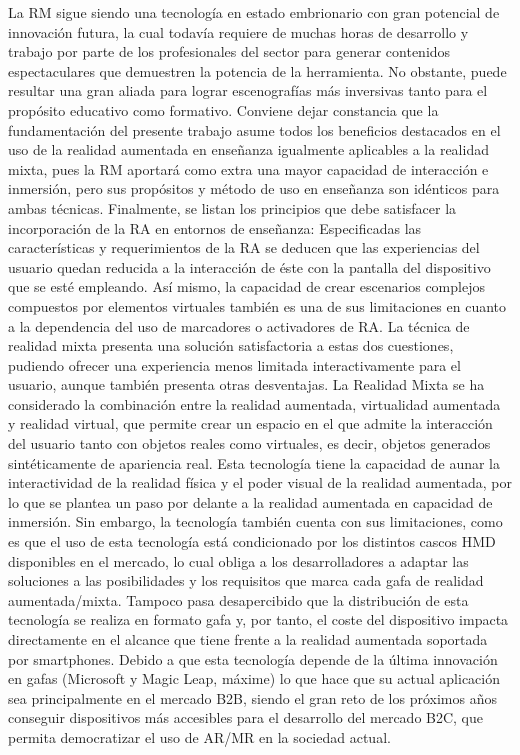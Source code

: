 La RM sigue siendo una tecnología en estado embrionario con gran potencial de innovación futura, la cual todavía requiere de muchas horas de desarrollo y trabajo por parte de los profesionales del sector para generar contenidos espectaculares que demuestren la potencia de la herramienta. No obstante, puede resultar una gran aliada para lograr escenografías más inversivas tanto para el propósito educativo como formativo.
Conviene dejar constancia que la fundamentación del presente trabajo asume todos los beneficios destacados en el uso de la realidad aumentada en enseñanza igualmente aplicables a la realidad mixta, pues la RM aportará como extra una mayor capacidad de interacción e inmersión, pero sus propósitos y método de uso en enseñanza son idénticos para ambas técnicas. Finalmente, se listan los principios que debe satisfacer la incorporación de la RA en entornos de enseñanza:
Especificadas las características y requerimientos de la RA se deducen que las experiencias del usuario quedan reducida a la interacción de éste con la pantalla del dispositivo que se esté empleando. Así mismo, la capacidad de crear escenarios complejos compuestos por elementos virtuales también es una de sus limitaciones en cuanto a la dependencia del uso de marcadores o activadores de RA. La técnica de realidad mixta presenta una solución satisfactoria a estas dos cuestiones, pudiendo ofrecer una experiencia menos limitada interactivamente para el usuario, aunque también presenta otras desventajas.
La Realidad Mixta se ha considerado la combinación entre la realidad aumentada, virtualidad aumentada y realidad virtual, que permite crear un espacio en el que admite la interacción del usuario tanto con objetos reales como virtuales, es decir, objetos generados sintéticamente de apariencia real. Esta tecnología tiene la capacidad de aunar la interactividad de la realidad física y el poder visual de la realidad aumentada, por lo que se plantea un paso por delante a la realidad aumentada en capacidad de inmersión. Sin embargo, la tecnología también cuenta con sus limitaciones, como es que el uso de esta tecnología está condicionado por los distintos cascos HMD disponibles en el mercado, lo cual obliga a los desarrolladores a adaptar las soluciones a las posibilidades y los requisitos que marca cada gafa de realidad aumentada/mixta. Tampoco pasa desapercibido que la distribución de esta tecnología se realiza en formato gafa y, por tanto, el coste del dispositivo impacta directamente en el alcance que tiene frente a la realidad aumentada soportada por smartphones. Debido a que esta tecnología depende de la última innovación en gafas (Microsoft y Magic Leap, máxime) lo que hace que su actual aplicación sea principalmente en el mercado B2B, siendo el gran reto de los próximos años conseguir dispositivos más accesibles para el desarrollo del mercado B2C, que permita democratizar el uso de AR/MR en la sociedad actual.
